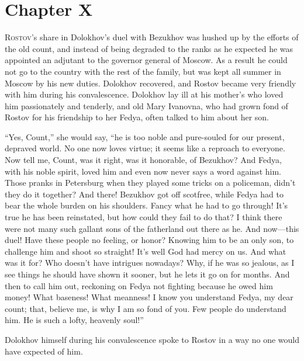 \chapter*{Chapter X}
\ifaudio     
{} 
\fi

\lettrine[lines=2, loversize=0.3, lraise=0]{\initfamily R}{ostov}'s
share in Dolokhov's duel with Bezukhov was hushed up by
the efforts of the old count, and instead of being degraded to
the ranks as he expected he was appointed an adjutant to the
governor general of Moscow. As a result he could not go to the
country with the rest of the family, but was kept all summer in
Moscow by his new duties. Dolokhov recovered, and Rostov became
very friendly with him during his convalescence. Dolokhov lay ill
at his mother's who loved him passionately and tenderly, and old
Mary Ivanovna, who had grown fond of Rostov for his friendship to
her Fedya, often talked to him about her son.

``Yes, Count,'' she would say, ``he is too noble and pure-souled
for our present, depraved world. No one now loves virtue; it
seems like a reproach to everyone. Now tell me, Count, was it
right, was it honorable, of Bezukhov? And Fedya, with his noble
spirit, loved him and even now never says a word against
him. Those pranks in Petersburg when they played some tricks on a
policeman, didn't they do it together? And there! Bezukhov got
off scotfree, while Fedya had to bear the whole burden on his
shoulders. Fancy what he had to go through! It's true he has been
reinstated, but how could they fail to do that? I think there
were not many such gallant sons of the fatherland out there as
he. And now---this duel! Have these people no feeling, or honor?
Knowing him to be an only son, to challenge him and shoot so
straight! It's well God had mercy on us. And what was it for? Who
doesn't have intrigues nowadays? Why, if he was so jealous, as I
see things he should have shown it sooner, but he lets it go on
for months. And then to call him out, reckoning on Fedya not
fighting because he owed him money! What baseness! What meanness!
I know you understand Fedya, my dear count; that, believe me, is
why I am so fond of you. Few people do understand him. He is such
a lofty, heavenly soul!''

Dolokhov himself during his convalescence spoke to Rostov in a
way no one would have expected of him.


